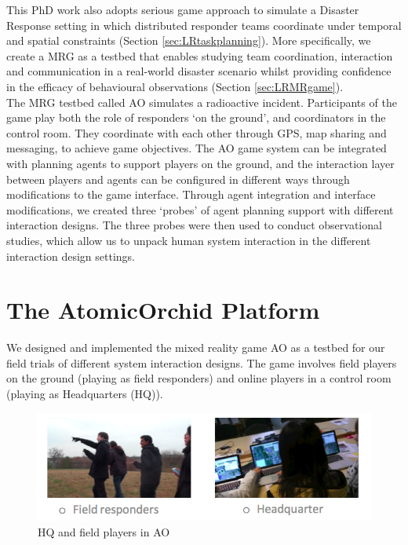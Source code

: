 This PhD work also adopts serious game approach to simulate a Disaster Response setting in which distributed responder teams coordinate under temporal and spatial constraints (Section \ref{sec:LRtaskplanning}). More specifically, we create a \acf{MRG} as a testbed that enables studying team coordination, interaction and communication in a real-world disaster scenario whilst providing confidence in the efficacy of behavioural observations (Section \ref{sec:LRMRgame}).\\

The \ac{MRG} testbed called \acf{AO} simulates a radioactive incident. Participants of the game play both the role of responders `on the ground', and coordinators in the control room. They coordinate with each other through GPS, map sharing and messaging, to achieve game objectives. The \ac{AO} game system can be integrated with planning agents to support players on the ground, and the interaction layer between players and agents can be configured in different ways through modifications to the game interface. Through agent integration and interface modifications, we created three `probes' of agent planning support with different interaction designs. The three probes were then used to conduct observational studies, which allow us to unpack human system interaction in the different interaction design settings.\\

\section{The AtomicOrchid Platform}\label{sec:AOdescription}
We designed and implemented the mixed reality game \acf{AO} as a testbed for our field trials of different system interaction designs. The game involves field players on the ground (playing as field responders) and online players in a control room (playing as Headquarters (HQ)).\\

\begin{figure}[h]
  \centering
  \includegraphics[width=1\textwidth]{img/approach/GameComponents}
  \caption{HQ and field players in AO}
  \label{fig:AOroles}
\end{figure}

